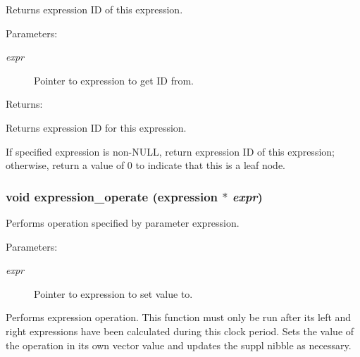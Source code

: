 Returns expression ID of this expression.

\begin{Desc}
\item[Parameters: ]\par
\begin{description}
\item[{\em 
expr}]Pointer to expression to get ID from. \end{description}
\end{Desc}
\begin{Desc}
\item[Returns: ]\par
Returns expression ID for this expression.\end{Desc}
If specified expression is non-NULL, return expression ID of this expression; otherwise, return a value of 0 to indicate that this is a leaf node. 
\subsubsection{\setlength{\rightskip}{0pt plus 5cm}void expression\_\-operate ({\bf expression} $\ast$ {\em expr})}\label{expr_8h_a7}


Performs operation specified by parameter expression.

\begin{Desc}
\item[Parameters: ]\par
\begin{description}
\item[{\em 
expr}]Pointer to expression to set value to.\end{description}
\end{Desc}
Performs expression operation. This function must only be run after its left and right expressions have been calculated during this clock period. Sets the value of the operation in its own vector value and updates the suppl nibble as necessary. 